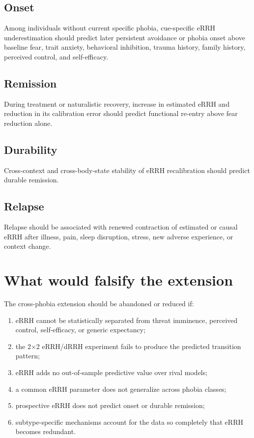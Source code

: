 \documentclass[10pt]{article}
\begin{document}
\subsection{Onset}
Among individuals without current specific phobia, cue-specific eRRH underestimation should predict later persistent avoidance or phobia onset above baseline fear, trait anxiety, behavioral inhibition, trauma history, family history, perceived control, and self-efficacy.

\subsection{Remission}
During treatment or naturalistic recovery, increase in estimated eRRH and reduction in its calibration error should predict functional re-entry above fear reduction alone.

\subsection{Durability}
Cross-context and cross-body-state stability of eRRH recalibration should predict durable remission.

\subsection{Relapse}
Relapse should be associated with renewed contraction of estimated or causal eRRH after illness, pain, sleep disruption, stress, new adverse experience, or context change.

\section{What would falsify the extension}
The cross-phobia extension should be abandoned or reduced if:
\begin{enumerate}[leftmargin=2em]
\item eRRH cannot be statistically separated from threat imminence, perceived control, self-efficacy, or generic expectancy;
\item the 2$\times$2 eRRH/dRRH experiment fails to produce the predicted transition pattern;
\item eRRH adds no out-of-sample predictive value over rival models;
\item a common eRRH parameter does not generalize across phobia classes;
\item prospective eRRH does not predict onset or durable remission;
\item subtype-specific mechanisms account for the data so completely that eRRH becomes redundant.
\end{enumerate}
\end{document}
